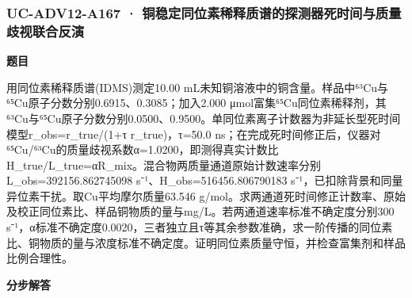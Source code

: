 \documentclass[UTF8,11pt,a4paper]{ctexart}
\begin{document}
\subsubsection*{UC-ADV12-A167 · 铜稳定同位素稀释质谱的探测器死时间与质量歧视联合反演}
\noindent\textbf{题目}\par
用同位素稀释质谱(IDMS)测定10.00 mL未知铜溶液中的铜含量。样品中⁶³Cu与⁶⁵Cu原子分数分别0.6915、0.3085；加入2.000 μmol富集⁶⁵Cu同位素稀释剂，其⁶³Cu与⁶⁵Cu原子分数分别0.0500、0.9500。单同位素离子计数器为非延长型死时间模型r\_obs=r\_true/(1+τ r\_true)，τ=50.0 ns；在完成死时间修正后，仪器对⁶⁵Cu/⁶³Cu的质量歧视系数α=1.0200，即测得真实计数比H\_true/L\_true=αR\_mix。混合物两质量通道原始计数速率分别L\_obs=392156.862745098 s⁻¹、H\_obs=516456.806790183 s⁻¹，已扣除背景和同量异位素干扰。取Cu平均摩尔质量63.546 g/mol。求两通道死时间修正计数率、原始及校正同位素比、样品铜物质的量与mg/L。若两通道速率标准不确定度分别300 s⁻¹，α标准不确定度0.0020，三者独立且τ等其余参数准确，求一阶传播的同位素比、铜物质的量与浓度标准不确定度。证明同位素质量守恒，并检查富集剂和样品比例合理性。\par
\medskip\noindent\textbf{分步解答}
\end{document}
